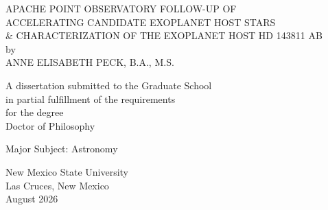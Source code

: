 \begin{center}
APACHE POINT OBSERVATORY FOLLOW-UP OF \\
ACCELERATING CANDIDATE EXOPLANET HOST STARS \\
\& CHARACTERIZATION OF THE EXOPLANET HOST HD 143811 AB \\
\bigskip
by\\
\bigskip
ANNE ELISABETH PECK, B.A., M.S.
\end{center}
\vspace{0.5in}
\begin{center}
A dissertation submitted to the Graduate School\\
\bigskip
in partial fulfillment of the requirements\\
\bigskip
for the degree\\
\bigskip
Doctor of Philosophy
\end{center}
\bigskip
\begin{center}
Major Subject: Astronomy
\end{center}
\vspace{1.0in}
\begin{center}
New Mexico State University\\
\bigskip
Las Cruces, New Mexico\\
\bigskip
August 2026 %
\end{center}

